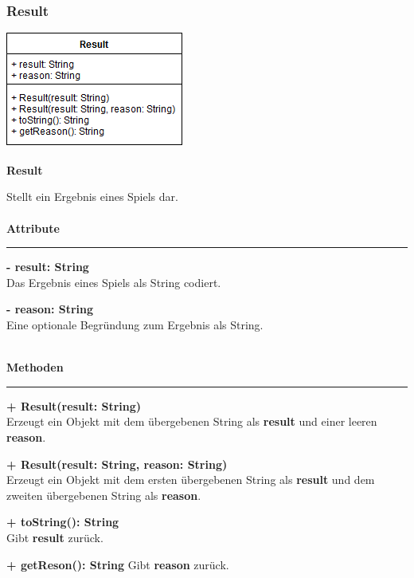 \documentclass[parskip=full]{scrartcl}
\begin{document}
		\newpage	
			
		\subsubsection{Result}
		
		\begin{minipage}{\linewidth}
			\centering
			\includegraphics[width=1\linewidth]{Diagramme/Result}
			\label{fig:result}
		\end{minipage}
		\textbf{\Large{Result}}
			
			Stellt ein Ergebnis eines Spiels dar.\\
			\\
				\textbf{\large{Attribute}}
				\newline
				\rule{\textwidth}{1pt}
			
				\begin{description}					
					\item \textbf{- result: String}\\ Das Ergebnis eines Spiels als String codiert.
					\item \textbf{- reason: String}\\ Eine optionale Begründung zum Ergebnis als String.\\
					\\
				\end{description}
				\textbf{\large{Methoden}}
				\newline
				\rule{\textwidth}{1pt}
				\begin{description}
					\item \textbf{+ Result(result: String)}\\ Erzeugt ein Objekt mit dem übergebenen String als \textbf{result} und einer leeren \textbf{reason}.
					\item \textbf{+ Result(result: String, reason: String)}\\ Erzeugt ein Objekt mit dem ersten übergebenen String als \textbf{result} und dem zweiten übergebenen String als \textbf{reason}.
					\item \textbf{+ toString(): String}\\ Gibt \textbf{result} zurück.
					\item \textbf{+ getReson(): String} Gibt \textbf{reason} zurück.						
				\end{description}		
		\newpage
		
\end{document}
